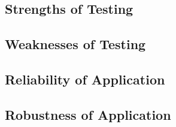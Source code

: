 \subsection{Strengths of Testing}

\subsection{Weaknesses of Testing}

\subsection{Reliability of Application}

\subsection{Robustness of Application}
